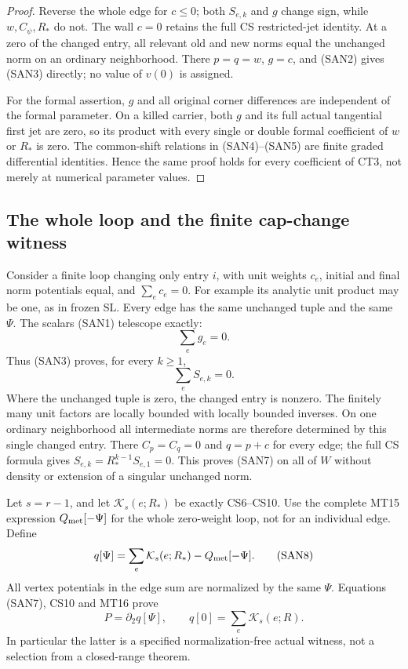 \begin{proof}
Reverse the whole edge for $c\le0$; both $S_{e,k}$ and $g$ change
sign, while $w,C_\psi,R_*$ do not.  The wall $c=0$ retains the
full CS restricted-jet identity.  At a zero of the changed entry,
all relevant old and new norms equal the unchanged norm on an
ordinary neighborhood.  There $p=q=w$, $g=c$, and (SAN2) gives
(SAN3) directly; no value of $v(0)$ is assigned.

For the formal assertion, $g$ and all original corner differences
are independent of the formal parameter.  On a killed carrier,
both $g$ and its full actual tangential first jet are zero, so its
product with every single or double formal coefficient of $w$ or
$R_*$ is zero.  The common-shift relations in (SAN4)--(SAN5) are
finite graded differential identities.  Hence the same proof holds
for every coefficient of CT3, not merely at numerical parameter
values.
\end{proof}

\subsection{The whole loop and the finite cap-change witness}

Consider a finite loop changing only entry $i$, with unit weights
$c_e$, initial and final norm potentials equal, and $\sum_e c_e=0$.
For example its analytic unit product may be one, as in frozen SL.
Every edge has the same unchanged tuple and the same $\Psi$.
The scalars (SAN1) telescope exactly:
\[
                     \sum_e g_e=0.
 \tag{SAN6}
\]
Thus (SAN3) proves, for every $k\ge1$,
\[
                     \sum_e S_{e,k}=0.
 \tag{SAN7}
\]
Where the unchanged tuple is zero, the changed entry is nonzero.
The finitely many unit factors are locally bounded with locally
bounded inverses.  On one ordinary neighborhood all intermediate
norms are therefore determined by this single changed entry.
There $C_p=C_q=0$ and $q=p+c$ for every edge; the full CS formula
gives $S_{e,k}=R_*^{k-1}S_{e,1}=0$.  This proves (SAN7) on all
of $W$ without density or extension of a singular unchanged norm.

Let $s=r-1$, and let $\mathcal K_s(e;R_*)$ be exactly CS6--CS10.
Use the complete MT15 expression $Q_{\rm met}[-\Psi]$ for the
whole zero-weight loop, not for an individual edge.  Define
\[
 q[\Psi]=\sum_e\mathcal K_s(e;R_*)-Q_{\rm met}[-\Psi].
 \tag{SAN8}
\]
All vertex potentials in the edge sum are normalized by the same
$\Psi$.  Equations (SAN7), CS10 and MT16 prove
\[
              P=\partial_2q[\Psi],\qquad
              q[0]=\sum_e\mathcal K_s(e;R).
 \tag{SAN9}
\]
In particular the latter is a specified normalization-free actual
witness, not a selection from a closed-range theorem.

